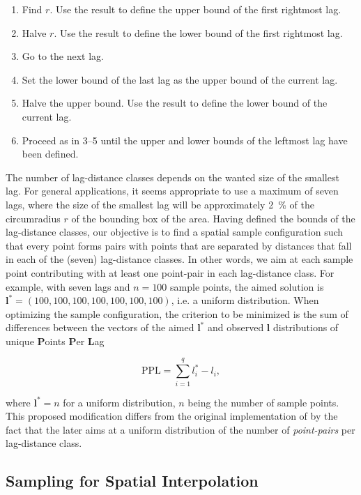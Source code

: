 \begin{enumerate}
 \item Find $r$. Use the result to define the upper bound of the first rightmost lag.
 \item Halve $r$. Use the result to define the lower bound of the first rightmost lag.
 \item Go to the next lag.
 \item Set the lower bound of the last lag as the upper bound of the current lag.
 \item Halve the upper bound. Use the result to define the lower bound of the current lag.
 \item Proceed as in 3--5 until the upper and lower bounds of the leftmost lag have been defined.
\end{enumerate}

\noindent The number of lag-distance classes depends on the wanted size of the smallest lag. For general 
applications, it seems appropriate to use a maximum of seven lags, where the size of the smallest lag will be 
approximately \SI{2}{\percent} of the circumradius $r$ of the bounding box of the area. Having defined the 
bounds of the lag-distance classes, our objective is to find a spatial sample configuration such that every 
point forms pairs with points that are separated by distances that fall in each of the (seven) lag-distance 
classes. In other words, we aim at each sample point contributing with at least one point-pair in each 
lag-distance class. For example, with seven lags and $n = 100$ sample points, the aimed solution is 
$\boldsymbol{l}^* = (100, 100, 100, 100, 100, 100, 100)$, i.e. a uniform distribution. When optimizing the 
sample configuration, the criterion to be minimized is the sum of differences between the vectors of the aimed 
$\boldsymbol{l}^*$ and observed $\boldsymbol{l}$ distributions of unique \textbf{P}oints \textbf{P}er 
\textbf{L}ag

\begin{equation}\label{eqn:chap08-ppl} %
 \text{PPL} = \sum_{i = 1}^{q} l_i^* - l_i,
\end{equation}

\noindent where $\boldsymbol{l}^* = n$ for a uniform distribution, $n$ being the number of sample points. This 
proposed modification differs from the original implementation of \citet{WarrickEtAl1987} by the fact that the 
later aims at a uniform distribution of the number of \emph{point-pairs} per lag-distance class.

\subsection{Sampling for Spatial Interpolation}

